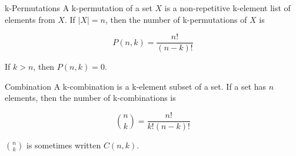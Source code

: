\documentclass[smaller]{beamer}
\begin{document}
\begin{frame}[label={sec:org701f159}]{k-Permutations}
A k-permutation of a set \(X\) is a non-repetitive k-element list of elements from \(X\).  If \(|X| = n\), then the number of k-permutations of \(X\) is

$$
P(n, k) = \frac{n!}{(n - k)!}
$$

If \(k > n\), then \(P(n, k) = 0\).
\end{frame}

\begin{frame}[label={sec:org411ad7f}]{Combination}
A k-combination is a k-element subset of a set.  If a set has \(n\) elements, then the number of k-combinations is

$$
\binom{n}{k} = \frac{n!}{k!(n - k)!}
$$

\(\binom{n}{k}\) is sometimes written \(C(n, k)\).
\end{frame}
\end{document}
